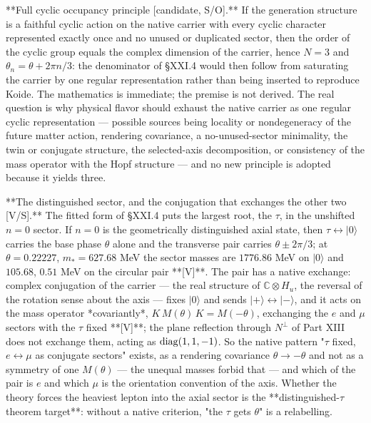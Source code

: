 **Full cyclic occupancy principle [candidate, S/O].** If the generation structure is a faithful cyclic action on the native carrier with every cyclic character represented exactly once and no unused or duplicated sector, then the order of the cyclic group equals the complex dimension of the carrier, hence $N = 3$ and $\theta_n = \theta+2\pi n/3$: the denominator of §XXI.4 would then follow from saturating the carrier by one regular representation rather than being inserted to reproduce Koide. The mathematics is immediate; the premise is not derived. The real question is why physical flavor should exhaust the native carrier as one regular cyclic representation — possible sources being locality or nondegeneracy of the future matter action, rendering covariance, a no-unused-sector minimality, the twin or conjugate structure, the selected-axis decomposition, or consistency of the mass operator with the Hopf structure — and no new principle is adopted because it yields three.

**The distinguished sector, and the conjugation that exchanges the other two [V/S].** The fitted form of §XXI.4 puts the largest root, the $\tau$, in the unshifted $n = 0$ sector. If $n = 0$ is the geometrically distinguished axial state, then $\tau\leftrightarrow|0\rangle$ carries the base phase $\theta$ alone and the transverse pair carries $\theta\pm2\pi/3$; at $\theta = 0.22227$, $m_* = 627.68$ MeV the sector masses are $1776.86$ MeV on $|0\rangle$ and $105.68$, $0.51$ MeV on the circular pair **[V]**. The pair has a native exchange: complex conjugation of the carrier — the real structure of $\mathbb C\otimes H_u$, the reversal of the rotation sense about the axis — fixes $|0\rangle$ and sends $|+\rangle\leftrightarrow|-\rangle$, and it acts on the mass operator *covariantly*, $K\,M(\theta)\,K = M(-\theta)$, exchanging the $e$ and $\mu$ sectors with the $\tau$ fixed **[V]**; the plane reflection through $N^\perp$ of Part XIII does not exchange them, acting as ${\rm diag}(1,1,-1)$. So the native pattern "$\tau$ fixed, $e\leftrightarrow\mu$ as conjugate sectors" exists, as a rendering covariance $\theta\to-\theta$ and not as a symmetry of one $M(\theta)$ — the unequal masses forbid that — and which of the pair is $e$ and which $\mu$ is the orientation convention of the axis. Whether the theory forces the heaviest lepton into the axial sector is the **distinguished-$\tau$ theorem target**: without a native criterion, "the $\tau$ gets $\theta$" is a relabelling.

